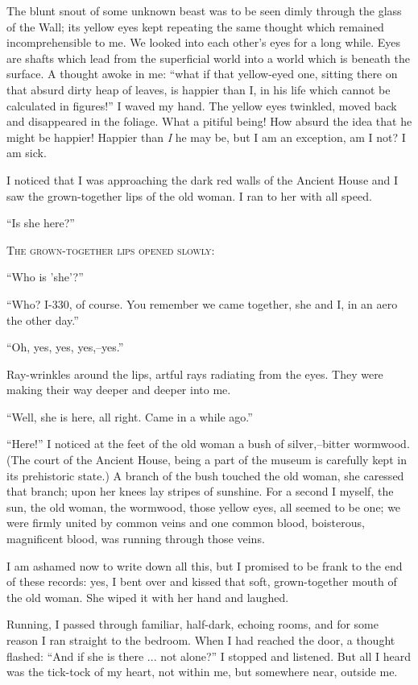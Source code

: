 \documentclass[11pt,openany]{book}
\begin{document}
The blunt snout of some unknown beast was to be seen dimly through the glass of the Wall; its yellow eyes kept repeating the same thought which remained incomprehensible to me. We looked into each other's eyes for a long while. Eyes are shafts which lead from the superficial world into a world which is beneath the surface. A thought awoke in me: ``what if that yellow-eyed one, sitting there on that absurd dirty heap of leaves, is happier than I, in his life which cannot be calculated in figures!'' I waved my hand. The yellow eyes twinkled, moved back and disappeared in the foliage. What a pitiful being! How absurd the idea that he might be happier! Happier than \emph{I} he may be, but I am an exception, am I not? I am sick.

I noticed that I was approaching the dark red walls of the Ancient House and I saw the grown-together lips of the old woman. I ran to her with all speed.

``Is she here?''

\begin{center}\textsc{The grown-together lips opened slowly:}\end{center}

``Who is 'she'?''

``Who? I-330, of course. You remember we came together, she and I, in an aero the other day.''

``Oh, yes, yes, yes,--yes.''

Ray-wrinkles around the lips, artful rays radiating from the eyes. They were making their way deeper and deeper into me.

``Well, she is here, all right. Came in a while ago.''

``Here!'' I noticed at the feet of the old woman a bush of silver,--bitter wormwood. (The court of the Ancient House, being a part of the museum is carefully kept in its prehistoric state.) A branch of the bush touched the old woman, she caressed that branch; upon her knees lay stripes of sunshine. For a second I myself, the sun, the old woman, the wormwood, those yellow eyes, all seemed to be one; we were firmly united by common veins and one common blood, boisterous, magnificent blood, was running through those veins.

I am ashamed now to write down all this, but I promised to be frank to the end of these records: yes, I bent over and kissed that soft, grown-together mouth of the old woman. She wiped it with her hand and laughed.

Running, I passed through familiar, half-dark, echoing rooms, and for some reason I ran straight to the bedroom. When I had reached the door, a thought flashed: ``And if she is there ... not alone?'' I stopped and listened. But all I heard was the tick-tock of my heart, not within me, but somewhere near, outside me.
\end{document}
